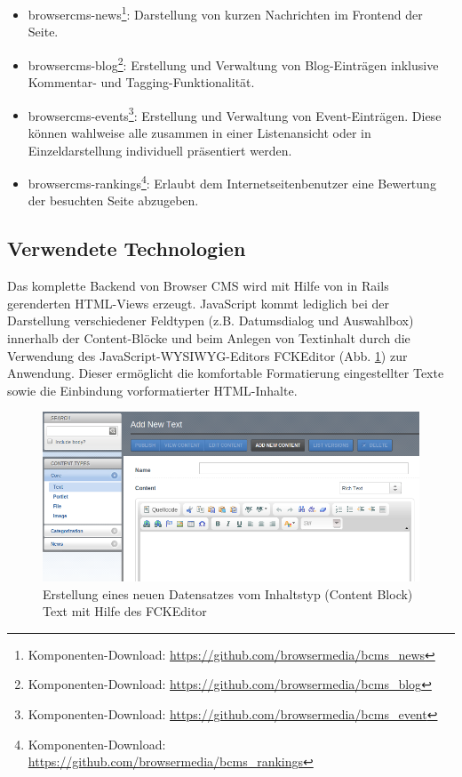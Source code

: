 \begin{itemize}
\item browsercms-news\footnote{Komponenten-Download: \href{https://github.com/browsermedia/bcms\_news}{https://github.com/browsermedia/bcms\_news}}: Darstellung von kurzen Nachrichten im Frontend der Seite.
\item browsercms-blog\footnote{Komponenten-Download: \href{https://github.com/browsermedia/bcms\_blog}{https://github.com/browsermedia/bcms\_blog}}: Erstellung und Verwaltung von Blog-Einträgen inklusive Kommentar- und Tagging-Funktionalität.
\item browsercms-events\footnote{Komponenten-Download: \href{https://github.com/browsermedia/bcms\_event}{https://github.com/browsermedia/bcms\_event}}: Erstellung und Verwaltung von Event-Einträgen. Diese können wahlweise alle zusammen in einer Listenansicht oder in Einzeldarstellung individuell präsentiert werden.
\item browsercms-rankings\footnote{Komponenten-Download: \href{https://github.com/browsermedia/bcms\_rankings}{https://github.com/browsermedia/bcms\_rankings}}: Erlaubt dem Internetseitenbenutzer eine Bewertung der besuchten Seite abzugeben.
\end{itemize}

\subsection{Verwendete Technologien}

Das komplette Backend von Browser CMS wird mit Hilfe von in Rails gerenderten HTML-Views erzeugt. JavaScript kommt lediglich bei der Darstellung verschiedener Feldtypen (z.B. Datumsdialog und Auswahlbox) innerhalb der Content-Blöcke und beim Anlegen von Textinhalt durch die Verwendung des JavaScript-WYSIWYG-Editors FCKEditor (Abb. \ref{browsereditor}) zur Anwendung. Dieser ermöglicht die komfortable Formatierung eingestellter Texte sowie die Einbindung vorformatierter HTML-Inhalte.

\begin{figure}
\begin{center}
\includegraphics[scale=0.50]{images/analyse/browser/editor.png}
\caption{Erstellung eines neuen Datensatzes vom Inhaltstyp (Content Block) Text mit Hilfe des FCKEditor}
\label{browsereditor}
\end{center}
\end{figure}

